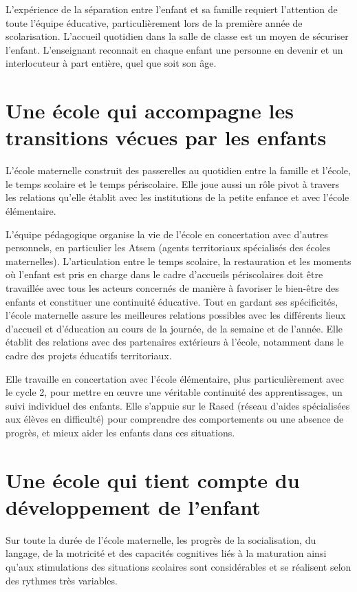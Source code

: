 L’expérience de la séparation entre l’enfant et sa famille requiert l’attention de toute l’équipe éducative, particulièrement lors de la première année de scolarisation. L’accueil quotidien dans la salle de classe est un moyen de sécuriser l’enfant. L’enseignant reconnait en chaque enfant une personne en devenir et un interlocuteur à part entière, quel que soit son âge.

\section{Une école qui accompagne les transitions vécues par les enfants}
L’école maternelle construit des passerelles au quotidien entre la famille et l'école, le temps scolaire et le temps périscolaire. Elle joue aussi un rôle pivot à travers les relations qu’elle établit avec les institutions de la petite enfance et avec l'école élémentaire.

L’équipe pédagogique organise la vie de l’école en concertation avec d’autres personnels, en particulier les Atsem (agents territoriaux spécialisés des écoles maternelles). L’articulation entre le temps scolaire, la restauration et les moments où l’enfant est pris en charge dans le cadre d'accueils périscolaires doit être travaillée avec tous les acteurs concernés de manière à favoriser le bien-être des enfants et constituer une continuité éducative. Tout en gardant ses spécificités, l’école maternelle assure les meilleures relations possibles avec les différents lieux d’accueil et d’éducation au cours de la journée, de la semaine et de l’année. Elle établit des relations avec des partenaires extérieurs à l’école, notamment dans le cadre des projets éducatifs territoriaux.

Elle travaille en concertation avec l’école élémentaire, plus particulièrement avec le cycle 2, pour mettre en œuvre une véritable continuité des apprentissages, un suivi individuel des enfants. Elle s’appuie sur le Rased (réseau d'aides spécialisées aux élèves en difficulté) pour comprendre des comportements ou une absence de progrès, et mieux aider les enfants dans ces situations. 

\section{Une école qui tient compte du développement de l’enfant}
Sur toute la durée de l’école maternelle, les progrès de la socialisation, du langage, de la motricité et des capacités cognitives liés à la maturation ainsi qu’aux stimulations des situations scolaires sont considérables et se réalisent selon des rythmes très variables. 

